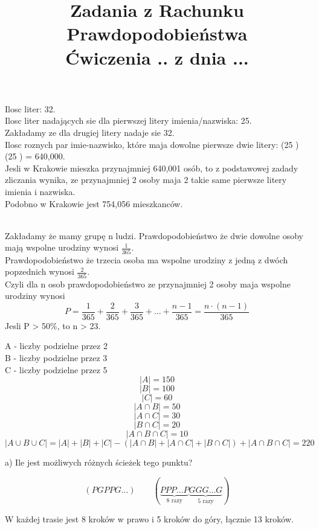 \documentclass[fleqn]{article}
\begin{document}
\title{Zadania z Rachunku Prawdopodobieństwa \\ Ćwiczenia .. z dnia ...}
\date{}
\medskip
{}
\medskip

Ilosc liter: 32. \\
Ilosc liter nadających sie dla pierwszej litery imienia/nazwiska: 25. \\
Zakładamy ze dla drugiej litery nadaje sie 32. \\
Ilosc roznych par imie-nazwisko, które maja dowolne pierwsze dwie litery: (25 ) \cdot (25 ) = 640,000. \\
Jesli w Krakowie mieszka przynajmniej 640,001 osób, to z podstawowej zadady zliczania wynika, ze przynajmniej 2 osoby maja 2 takie same pierwsze litery imienia i nazwiska. \\
Podobno w Krakowie jest 754,056 mieszkanców. \\
\\

\medskip

Zakładamy że mamy grupę n ludzi.
Prawdopodobieństwo że dwie dowolne osoby mają wspolne urodziny wynosi $\frac{1}{365}$.\\
Prawdopodobieństwo że trzecia osoba ma wspolne urodziny z jedną z dwóch popzednich wynosi $\frac{2}{365}$.\\
Czyli dla n osob prawdopodobieństwo ze przynajmniej 2 osoby maja wspolne urodziny wynosi
\[P = \frac{1}{365} + \frac{2}{365} + \frac{3}{365} + ... + \frac{n - 1}{365} = \frac{n\cdot(n-1)}{365}\]
Jesli P > 50\%, to n > 23.
\medskip

\medskip

A - liczby podzielne przez 2 \\
B - liczby podzielne przez 3 \\
C - liczby podzielne przez 5 \\
\[|A| = 150\]
\[|B| = 100\]
\[|C| = 60 \]
\[|A \cap B| = 50\]
\[|A \cap C| = 30\]
\[|B \cap C| = 20\]
\[|A \cap B \cap C| = 10\]
\[|A \cup B \cup C| = |A| + |B| + |C| - (|A \cap B|  + |A \cap C| + |B \cap C|) + |A \cap B \cap C| = 220 \]

\medskip

a) Ile jest możliwych różnych ścieżek tego punktu?

\[(PGPPG...) \qquad
(\underbrace{PPP...P}_{\displaystyle\text{8 razy}}
\underbrace{GGG...G}_{\displaystyle\text{5 razy}})\]

W każdej trasie jest 8 kroków w prawo i 5 kroków do góry, łącznie 13 kroków.
\end{document}

